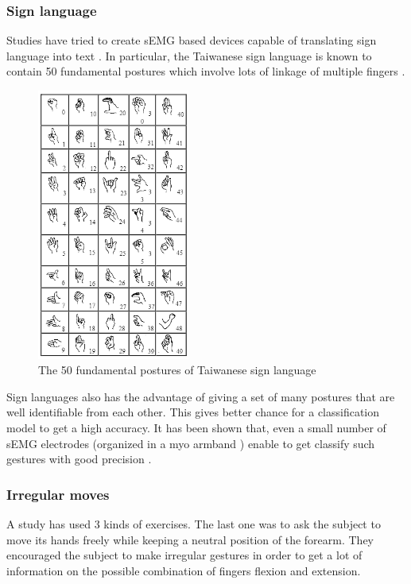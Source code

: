 \documentclass{article}
\begin{document}
\subsubsection{Sign language}

Studies have tried to create sEMG based devices capable of translating sign language into text \cite{ref:signLang, ref:signLang2}. In particular, the Taiwanese sign language is known to contain 50 fundamental postures which involve lots of linkage of multiple fingers \cite{ref:singleFingerGestPlusSignLang, ref:signLang}.

\begin{figure}[H]
    \centering
    \includegraphics[width=5cm]{images/taiwaneseSignLanguage.png}
    \caption{The 50 fundamental postures of Taiwanese sign language \cite{ref:signLang}}
    \label{fig:signLang}
\end{figure}

Sign languages also has the advantage of giving a set of many postures that are well identifiable from each other. This gives better chance for a classification model to get a high accuracy. It has been shown that, even a small number of sEMG electrodes (organized in a myo armband \cite{ref:myoArmBand}) enable to get classify such gestures with good precision \cite{ref:signLang2}.





\subsubsection{Irregular moves}

A study \cite{ref:Ngeo2014} has used 3 kinds of exercises. The last one was to ask the subject to move its hands freely while keeping a neutral position of the forearm. They encouraged the subject to make irregular gestures in order to get a lot of information on the possible combination of fingers flexion and extension.
\end{document}
